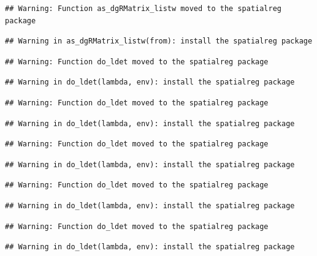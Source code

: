 \documentclass[11pt,]{article}
\begin{document}
\begin{verbatim}
## Warning: Function as_dgRMatrix_listw moved to the spatialreg package
\end{verbatim}

\begin{verbatim}
## Warning in as_dgRMatrix_listw(from): install the spatialreg package
\end{verbatim}

\begin{verbatim}
## Warning: Function do_ldet moved to the spatialreg package
\end{verbatim}

\begin{verbatim}
## Warning in do_ldet(lambda, env): install the spatialreg package
\end{verbatim}

\begin{verbatim}
## Warning: Function do_ldet moved to the spatialreg package
\end{verbatim}

\begin{verbatim}
## Warning in do_ldet(lambda, env): install the spatialreg package
\end{verbatim}

\begin{verbatim}
## Warning: Function do_ldet moved to the spatialreg package
\end{verbatim}

\begin{verbatim}
## Warning in do_ldet(lambda, env): install the spatialreg package
\end{verbatim}

\begin{verbatim}
## Warning: Function do_ldet moved to the spatialreg package
\end{verbatim}

\begin{verbatim}
## Warning in do_ldet(lambda, env): install the spatialreg package
\end{verbatim}

\begin{verbatim}
## Warning: Function do_ldet moved to the spatialreg package
\end{verbatim}

\begin{verbatim}
## Warning in do_ldet(lambda, env): install the spatialreg package
\end{verbatim}
\end{document}
